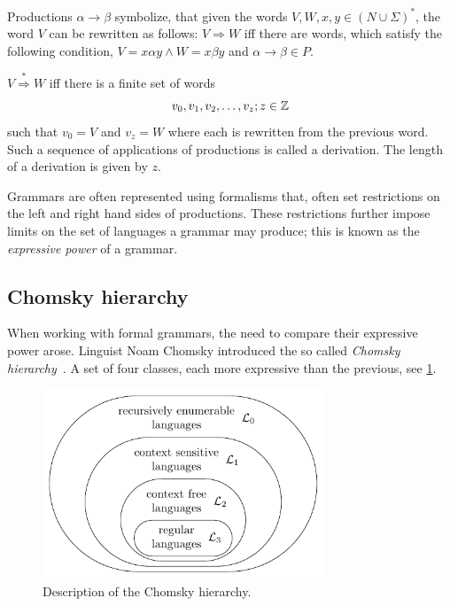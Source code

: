 Productions $\alpha \rightarrow \beta$ symbolize, that given the words $V,W,x,y \in \left( N \cup \Sigma \right)^{*}$, the word $V$ can be rewritten as follows:
$V \Rightarrow W$ iff there are words, which satisfy the following condition, $V=x\alpha y \wedge W=x\beta y$ and $\alpha \rightarrow \beta \in P$.

\begin{definition}[Derivation]
\label{def:derivation}
$V \stackrel{*}{\Rightarrow}  W$ iff there is a finite set of words 
$$ v_0, v_1, v_2, \dots, v_z;\medskip z \in \mathbb{Z}$$
such that $v_0 = V$ and $v_z = W$ where each is rewritten from the previous word. Such a sequence of applications of productions is called a derivation.
The length of a derivation is given by $z$. 
\end{definition}

Grammars are often represented using formalisms that, often set restrictions on the left and right hand sides of productions. These restrictions further impose limits on the set of languages a grammar may produce; this is known as the \emph{expressive power} of a grammar. 

\subsection{Chomsky hierarchy}
When working with formal grammars, the need to compare their expressive power arose. Linguist Noam Chomsky introduced the so called \emph{Chomsky hierarchy}~\cite{chomsky1956three}. A set of four classes, each more expressive than the previous, see \cref{fig:chomsky-hierarchy}.



\begin{figure}[H]\label{fig:chomsky-hierarchy}
  \centering
  \includegraphics[width=0.75\textwidth]{figures/chomsky-hierarchy.pdf}
  \caption{Description of the Chomsky hierarchy.}
\end{figure}

